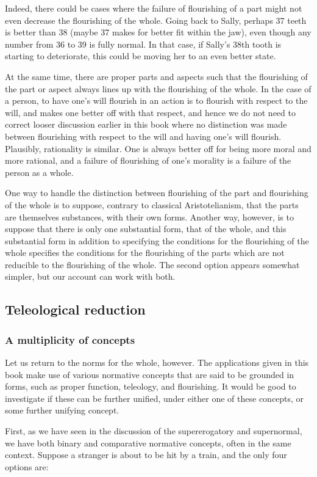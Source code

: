 Indeed, there could be cases where the failure of flourishing of a part might not even decrease the flourishing
of the whole. Going back to Sally, perhaps 37 teeth is better than 38 (maybe 37 makes for better fit within the jaw),
even though any number from 36 to 39 is fully normal. In that case, if Sally's 38th tooth is starting to deteriorate, this could
be moving her to an even better state. 

At the same time, there are proper parts and aspects such that the flourishing of the part or aspect always lines up with the
flourishing of the whole. In the case of a person, to have one's will flourish in an action is to flourish with respect to the 
will, and makes one better off with that respect, and hence we do not need to correct looser discussion earlier in this book where
no distinction was made between flourishing with respect to the will and having one's will flourish. Plausibly, rationality is similar. 
One is always better off for being more moral and more rational, and a failure of flourishing of one's morality is a failure of the 
person as a whole. 

One way to handle the distinction between flourishing of the part and flourishing of the whole is to suppose,
contrary to classical Aristotelianism, that the parts are themselves substances, with their own forms. Another
way, however, is to suppose that there is only one substantial form, that of the whole, and this substantial
form in addition to specifying the conditions for the flourishing of the whole specifies the conditions for the
flourishing of the parts which are not reducible to the flourishing of the whole. The second option appears
somewhat simpler, but our account can work with both.

\subsection{Teleological reduction}
\subsubsection{A multiplicity of concepts}
Let us return to the norms for the whole, however.
The applications given in this book make use of various normative concepts that are said to be grounded in forms,
such as proper function, teleology, and flourishing. It would be good to investigate if these 
can be further unified, under either one of these concepts, or some further unifying concept.

First, as we have seen in the discussion of the supererogatory and supernormal, we have both binary and comparative normative 
concepts, often in the same context. Suppose a stranger is about to be hit by a train, and the only four options are:


